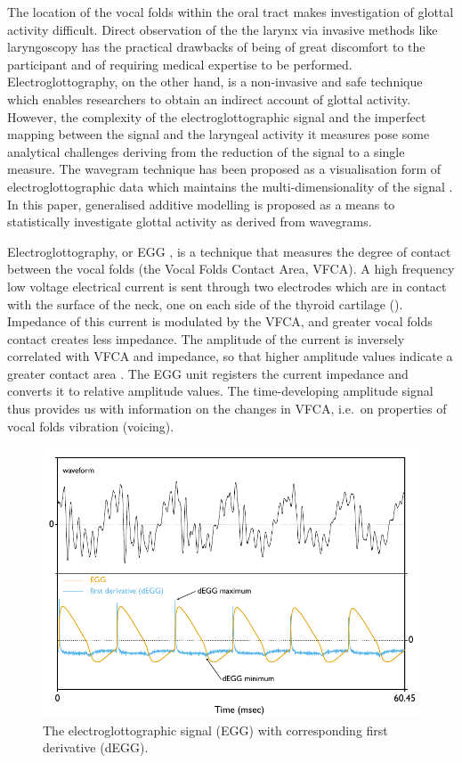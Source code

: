 \documentclass[
  11pt,
  a4paper,
]{article}
\begin{document}
The location of the vocal folds within the oral tract makes
investigation of glottal activity difficult. Direct observation of the
the larynx via invasive methods like laryngoscopy has the practical
drawbacks of being of great discomfort to the participant and of
requiring medical expertise to be performed. Electroglottography, on the
other hand, is a non-invasive and safe technique which enables
researchers to obtain an indirect account of glottal activity. However,
the complexity of the electroglottographic signal and the imperfect
mapping between the signal and the laryngeal activity it measures pose
some analytical challenges deriving from the reduction of the signal to
a single measure. The wavegram technique has been proposed as a
visualisation form of electroglottographic data which maintains the
multi-dimensionality of the signal \citep{herbst2010}. In this paper,
generalised additive modelling \citep{hastie1986} is proposed as a means
to statistically investigate glottal activity as derived from wavegrams.

Electroglottography, or EGG \citep{fabre1957}, is a technique that
measures the degree of contact between the vocal folds (the Vocal Folds
Contact Area, VFCA). A high frequency low voltage electrical current is
sent through two electrodes which are in contact with the surface of the
neck, one on each side of the thyroid cartilage ().
Impedance of this current is modulated by the VFCA, and greater vocal
folds contact creates less impedance. The amplitude of the current is
inversely correlated with VFCA and impedance, so that higher amplitude
values indicate a greater contact area \citep{titze1990}. The EGG unit
registers the current impedance and converts it to relative amplitude
values. The time-developing amplitude signal thus provides us with
information on the changes in VFCA, i.e.~on properties of vocal folds
vibration (voicing).

\begin{figure}
  \centering
  \includegraphics{./img/degg-signal.pdf}
  \caption{The electroglottographic signal (EGG) with corresponding first derivative (dEGG).}
  \label{f:egg}
\end{figure}
\end{document}
